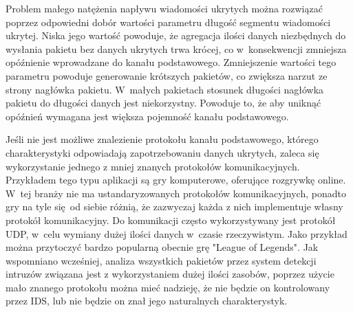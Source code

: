 \documentclass[a4paper, twoside, 12pt]{report}
\begin{document}
       Problem małego natężenia napływu wiadomości ukrytych można rozwiązać poprzez
       odpowiedni dobór wartości parametru długość segmentu wiadomości ukrytej.
       Niska jego wartość powoduje, że agregacja ilości danych niezbędnych do
       wysłania pakietu bez danych ukrytych trwa krócej, co w~konsekwencji zmniejsza
       opóźnienie wprowadzane do kanału podstawowego. Zmniejszenie wartości tego parametru powoduje generowanie
       krótszych pakietów, co zwiększa narzut ze strony nagłówka pakietu. W~małych
       pakietach stosunek długości nagłówka pakietu do długości danych jest niekorzystny.
       Powoduje to, że aby uniknąć opóźnień wymagana jest większa pojemność kanału
       podstawowego.

       Jeśli nie jest możliwe znalezienie protokołu kanału podstawowego, którego
       charakterystyki odpowiadają zapotrzebowaniu danych ukrytych, zaleca się
       wykorzystanie jednego z mniej znanych protokołów komunikacyjnych. Przykładem
       tego typu aplikacji są gry komputerowe, oferujące rozgrywkę online. W~tej
       branży nie ma ustandaryzowanych protokołów komunikacyjnych, ponadto gry na
       tyle się od siebie różnią, że zazwyczaj każda z nich implementuje własny
       protokół komunikacyjny. Do komunikacji często wykorzystywany jest protokół
       UDP, w~celu wymiany dużej ilości danych w~czasie rzeczywistym. Jako przykład
       można przytoczyć bardzo popularną obecnie grę "League of Legends". Jak wspomniano
       wcześniej, analiza wszystkich pakietów przez system detekcji intruzów
       związana jest z wykorzystaniem dużej ilości zasobów, poprzez użycie mało
       znanego protokołu można mieć nadzieję, że nie będzie on kontrolowany
       przez IDS, lub nie będzie on znał jego naturalnych charakterystyk.
\end{document}
